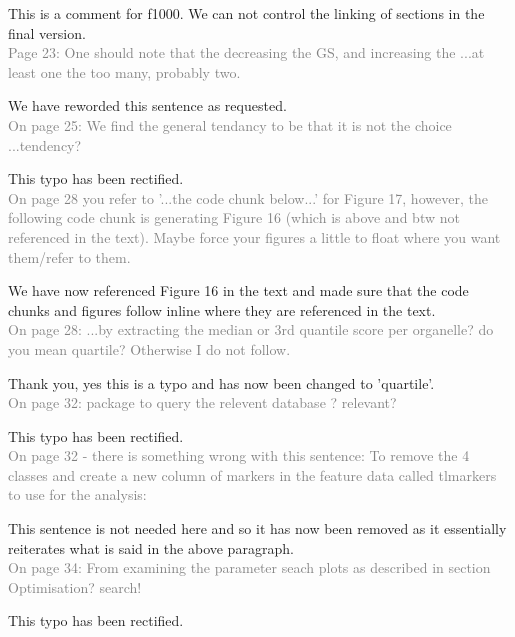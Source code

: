 \documentclass[11pt]{article}
\begin{document}
This is a comment for f1000. We can not control the linking of sections in the final version. \\

\textcolor{gray} {Page 23: One should note that the decreasing the GS, and increasing the ...at least one the too many, probably two.} 
 
We have reworded this sentence as requested. \\

\textcolor{gray} {On page 25: We find the general tendancy to be that it is not the choice ...tendency?} 

This typo has been rectified. \\

\textcolor{gray} {On page 28 you refer to '...the code chunk below...' for Figure 17, however, the following code chunk is generating Figure 16 (which is above and btw not referenced in the text). Maybe force your figures a little to float where you want them/refer to them.} 

We have now referenced Figure 16 in the text and made sure that the code chunks and figures follow inline where they are referenced in the text. \\
 
\textcolor{gray} {On page 28: ...by extracting the median or 3rd quantile score per organelle? do you mean quartile? Otherwise I do not follow.} 

Thank you, yes this is a typo and has now been changed to 'quartile'. \\
 
\textcolor{gray} {On page 32: package to query the relevent database ? relevant?} 

This typo has been rectified. \\

\textcolor{gray} {On page 32 - there is something wrong with this sentence: To remove the 4 classes and create a new column of markers in the feature data called tlmarkers to use for the analysis:} 
 
This sentence is not needed here and so it has now been removed as it essentially reiterates what is said in the above paragraph. \\

\textcolor{gray} {On page 34: From examining the parameter seach plots as described in section Optimisation? search!} 

This typo has been rectified.  \\
\end{document}
